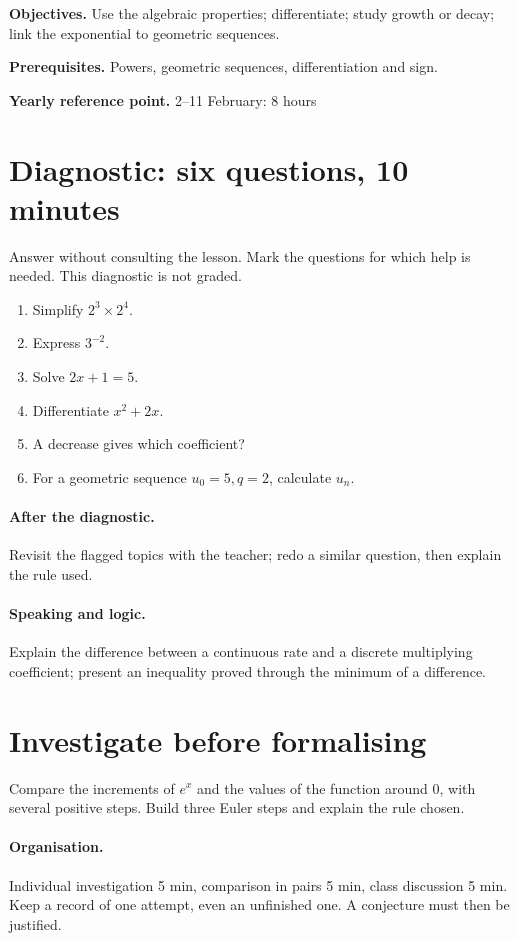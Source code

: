 \label{C09}
\begin{keypoint}
\textbf{Objectives.} Use the algebraic properties; differentiate; study growth or decay; link the exponential to geometric sequences.

\textbf{Prerequisites.} Powers, geometric sequences, differentiation and sign.

\textbf{Yearly reference point.} 2--11 February: 8 hours\end{keypoint}
\section*{Diagnostic: six questions, 10 minutes}\label{C09-D}
Answer without consulting the lesson. Mark the questions for which help is needed. This diagnostic is not graded.
\begin{enumerate}
\item Simplify $2^3\times2^4$.
\item Express $3^{-2}$.
\item Solve $2x+1=5$.
\item Differentiate $x^2+2x$.
\item A  decrease gives which coefficient?
\item For a geometric sequence $u_0=5,q=2$, calculate $u_n$.
\end{enumerate}
\paragraph{After the diagnostic.} Revisit the flagged topics with the teacher; redo a similar question, then explain the rule used.
\paragraph{Speaking and logic.} Explain the difference between a continuous rate and a discrete multiplying coefficient; present an inequality proved through the minimum of a difference.
\mxnewpage
\section*{Investigate before formalising}\label{C09-RECH}
Compare the increments of $e^x$ and the values of the function around 0, with several positive steps. Build three Euler steps and explain the rule chosen.
\paragraph{Organisation.} Individual investigation 5 min, comparison in pairs 5 min, class discussion 5 min. Keep a record of one attempt, even an unfinished one. A conjecture must then be justified.
\mxnewpage
